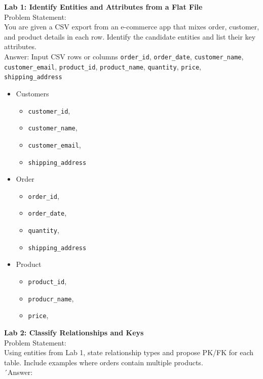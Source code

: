 \documentclass[10pt,twoside,a4paper]{report}
\begin{document}
	{\bf{\Large{Lab 1: Identify Entities and Attributes from a Flat File}}}\\
	
    	{\Large{Problem Statement:}} \\
	
	You are given a CSV export from an e-commerce app that mixes order, customer, and product details in each row. Identify the candidate entities and list their key attributes.\\
	
	{\Large{Answer:}}   Input CSV rows or columns
	\texttt{order\_id}, \texttt{order\_date}, \texttt{customer\_name},
	\texttt{customer\_email}, \texttt{product\_id}, \texttt{product\_name},
	\texttt{quantity}, \texttt{price}, \texttt{shipping\_address}\\
	
	\begin{itemize}
		\item Customers
		    \begin{itemize}
		    	\item  \texttt{customer\_id},
		    	\item  \texttt{customer\_name},
		    	 \item \texttt{customer\_email},
		    	 \item \texttt{shipping\_address}
		    \end{itemize}
		    \item Order
		    \begin{itemize}
		    	\item  \texttt{order\_id},
		    	\item  \texttt{order\_date},
		    	\item{\texttt{quantity}},
		    	\item \texttt{shipping\_address}    
	\end{itemize}
	\item Product
	    \begin{itemize}
	    	\item  \texttt{product\_id},
	    	\item  \texttt{producr\_name},
	    	\item \texttt{price},
	    		    \end{itemize}
	
	\end{itemize}
	
	{\bf{\Large{Lab 2: Classify Relationships and Keys}}}\\
	
{\Large{Problem Statement:}} \\
	
	Using entities from Lab 1, state relationship types and propose PK/FK for each table. Include examples where orders contain multiple products.\\
	
	´\Large {Answer:}
\begin{tabular} {|c|c|c|}
	
	\end{tabular}
	
\end{document}
